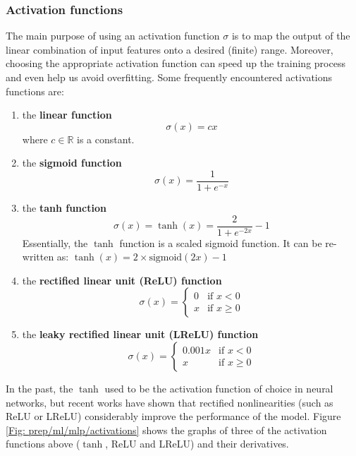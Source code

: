 	\subsubsection*{Activation functions}
	The main purpose of using an activation function $\sigma$ is to map the output of the linear combination of input features onto a desired (finite) range. Moreover, choosing the appropriate activation function can speed up the training process and even help us avoid overfitting. Some frequently encountered activations functions are:
	\begin{enumerate}
		\item the \textbf{linear function}
		\begin{equation}
		\sigma(x) = cx 
		\end{equation}
		where $c \in \mathbb{R}$ is a constant. 
		
		\item the \textbf{sigmoid function}
		\begin{equation}
		\sigma(x) = \frac{1}{1+e^{-x}}
		\end{equation}
		
		\item the \textbf{tanh function}
		\begin{equation}
		\sigma(x) = \tanh(x) = \frac{2}{1+e^{-2x}} - 1
		\end{equation}
		Essentially, the $\tanh$ function is a scaled sigmoid function. It can be re-written as: $\tanh(x) = 2 \times \text{sigmoid}(2x) - 1$ 
		
		\item the \textbf{rectified linear unit (ReLU) function}
		\begin{equation}
		\sigma(x) = 
		\begin{cases}
		0 & \text{if } x < 0 \\
		x & \text{if } x \geq 0
		\end{cases}
		\end{equation}
		
		\item the \textbf{leaky rectified linear unit (LReLU) function}
		\begin{equation}
		\sigma(x) = 
		\begin{cases}
		0.001x & \text{if } x < 0 \\
		x & \text{if } x \geq 0
		\end{cases}
		\end{equation}
	\end{enumerate} 
	In the past, the $\tanh$ used to be the activation function of choice in neural networks, but recent works\cite{nonlinearities} have shown that rectified nonlinearities (such as ReLU or LReLU) considerably improve the performance of the model. Figure \ref{Fig: prep/ml/mlp/activations} shows the graphs of three of the activation functions above ($\tanh$, ReLU and LReLU) and their derivatives.
